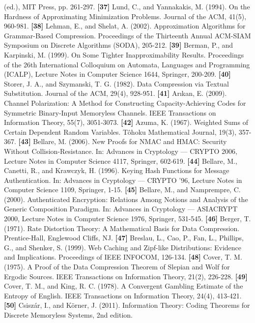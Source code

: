 \documentclass[
]{article}
\begin{document}
(ed.), MIT Press, pp. 261-297.
\textbf{{[}37{]}} Lund, C., and Yannakakis, M. (1994). On the
Hardness of Approximating Minimization Problems. Journal of the ACM,
41(5), 960-981.
\textbf{{[}38{]}} Lehman, E., and Shelat, A. (2002). Approximation
Algorithms for Grammar-Based Compression. Proceedings of the
Thirteenth Annual ACM-SIAM Symposium on Discrete Algorithms (SODA),
205-212.
\textbf{{[}39{]}} Berman, P., and Karpinski, M. (1999). On Some
Tighter Inapproximability Results. Proceedings of the 26th
International Colloquium on Automata, Languages and Programming
(ICALP), Lecture Notes in Computer Science 1644, Springer, 200-209.
\textbf{{[}40{]}} Storer, J. A., and Szymanski, T. G. (1982). Data
Compression via Textual Substitution. Journal of the ACM, 29(4),
928-951.
\textbf{{[}41{]}} Ar{\i}kan, E. (2009). Channel Polarization: A Method
for Constructing Capacity-Achieving Codes for Symmetric Binary-Input
Memoryless Channels. IEEE Transactions on Information Theory, 55(7),
3051-3073.
\textbf{{[}42{]}} Azuma, K. (1967). Weighted Sums of Certain Dependent
Random Variables. T\^ohoku Mathematical Journal, 19(3), 357-367.
\textbf{{[}43{]}} Bellare, M. (2006). New Proofs for NMAC and HMAC:
Security Without Collision-Resistance. In: Advances in Cryptology ---
CRYPTO 2006, Lecture Notes in Computer Science 4117, Springer, 602-619.
\textbf{{[}44{]}} Bellare, M., Canetti, R., and Krawczyk, H. (1996).
Keying Hash Functions for Message Authentication. In: Advances in
Cryptology --- CRYPTO '96, Lecture Notes in Computer Science 1109,
Springer, 1-15.
\textbf{{[}45{]}} Bellare, M., and Namprempre, C. (2000). Authenticated
Encryption: Relations Among Notions and Analysis of the Generic
Composition Paradigm. In: Advances in Cryptology --- ASIACRYPT 2000,
Lecture Notes in Computer Science 1976, Springer, 531-545.
\textbf{{[}46{]}} Berger, T. (1971). Rate Distortion Theory: A
Mathematical Basis for Data Compression. Prentice-Hall, Englewood
Cliffs, NJ.
\textbf{{[}47{]}} Breslau, L., Cao, P., Fan, L., Phillips, G., and
Shenker, S. (1999). Web Caching and Zipf-like Distributions: Evidence
and Implications. Proceedings of IEEE INFOCOM, 126-134.
\textbf{{[}48{]}} Cover, T. M. (1975). A Proof of the Data Compression
Theorem of Slepian and Wolf for Ergodic Sources. IEEE Transactions on
Information Theory, 21(2), 226-228.
\textbf{{[}49{]}} Cover, T. M., and King, R. C. (1978). A Convergent
Gambling Estimate of the Entropy of English. IEEE Transactions on
Information Theory, 24(4), 413-421.
\textbf{{[}50{]}} Csisz\'ar, I., and K\"orner, J. (2011). Information
Theory: Coding Theorems for Discrete Memoryless Systems, 2nd edition.
\end{document}
